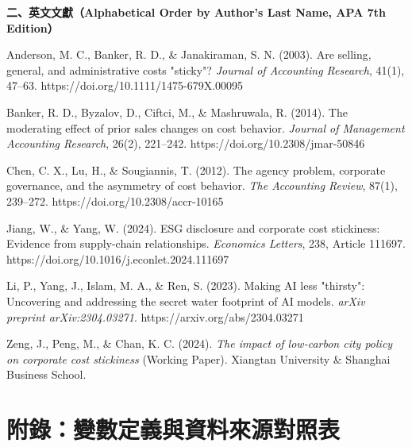 \documentclass[12pt,a4paper]{article}
\begin{document}
\vspace{1em}
\noindent \textbf{二、英文文獻（Alphabetical Order by Author's Last Name, APA 7th Edition）}

\begin{enumerate}[label={[\arabic*]}, leftmargin=3em, resume]
    \item Anderson, M. C., Banker, R. D., \& Janakiraman, S. N. (2003). Are selling, general, and administrative costs "sticky"? \textit{Journal of Accounting Research}, 41(1), 47--63. https://doi.org/10.1111/1475-679X.00095
    \item Banker, R. D., Byzalov, D., Ciftci, M., \& Mashruwala, R. (2014). The moderating effect of prior sales changes on cost behavior. \textit{Journal of Management Accounting Research}, 26(2), 221--242. https://doi.org/10.2308/jmar-50846
    \item Chen, C. X., Lu, H., \& Sougiannis, T. (2012). The agency problem, corporate governance, and the asymmetry of cost behavior. \textit{The Accounting Review}, 87(1), 239--272. https://doi.org/10.2308/accr-10165
    \item Jiang, W., \& Yang, W. (2024). ESG disclosure and corporate cost stickiness: Evidence from supply-chain relationships. \textit{Economics Letters}, 238, Article 111697. https://doi.org/10.1016/j.econlet.2024.111697
    \item Li, P., Yang, J., Islam, M. A., \& Ren, S. (2023). Making AI less "thirsty": Uncovering and addressing the secret water footprint of AI models. \textit{arXiv preprint arXiv:2304.03271}. https://arxiv.org/abs/2304.03271
    \item Zeng, J., Peng, M., \& Chan, K. C. (2024). \textit{The impact of low-carbon city policy on corporate cost stickiness} (Working Paper). Xiangtan University \& Shanghai Business School.
\end{enumerate}

\newpage

\section*{附錄：變數定義與資料來源對照表}
\end{document}
